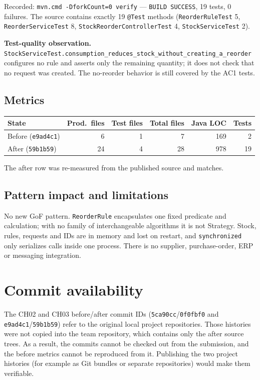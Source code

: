 \documentclass[11pt,a4paper]{article}
\newcommand{\code}[1]{\nolinkurl{#1}}
\begin{document}
Recorded: \code{mvn.cmd -DforkCount=0 verify} --- \texttt{BUILD SUCCESS}, 19 tests, 0 failures. The source contains exactly 19 \code{@Test} methods (\code{ReorderRuleTest} 5, \code{ReorderServiceTest} 8, \code{StockReorderControllerTest} 4, \code{StockServiceTest} 2).

\textbf{Test-quality observation.} \code{StockServiceTest.consumption_reduces_stock_without_creating_a_reorder} configures no rule and asserts only the remaining quantity; it does not check that no request was created. The no-reorder behavior is still covered by the AC1 tests.

\subsection{Metrics}
\begin{tabularx}{\linewidth}{@{}Yrrrrr@{}}
\toprule
State & Prod.\ files & Test files & Total files & Java LOC & Tests\\
\midrule
Before (\code{e9ad4c1}) & 6 & 1 & 7 & 169 & 2\\
After (\code{59b1b59}) & 24 & 4 & 28 & 978 & 19\\
\bottomrule
\end{tabularx}
The after row was re-measured from the published source and matches.

\subsection{Pattern impact and limitations}
No new GoF pattern. \code{ReorderRule} encapsulates one fixed predicate and calculation; with no family of interchangeable algorithms it is not Strategy. Stock, rules, requests and IDs are in memory and lost on restart, and \code{synchronized} only serializes calls inside one process. There is no supplier, purchase-order, ERP or messaging integration.

\section{Commit availability}
The CH02 and CH03 before/after commit IDs (\code{5ca90cc}/\code{0f0fbf0} and \code{e9ad4c1}/\code{59b1b59}) refer to the original local project repositories. Those histories were not copied into the team repository, which contains only the after source trees. As a result, the commits cannot be checked out from the submission, and the before metrics cannot be reproduced from it. Publishing the two project histories (for example as Git bundles or separate repositories) would make them verifiable.
\end{document}
